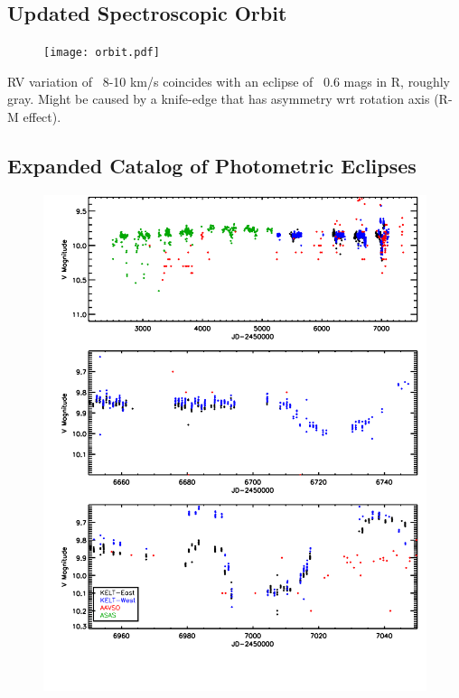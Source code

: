 \documentclass{aastex6}
\begin{document}
\subsection{Updated Spectroscopic Orbit}

\begin{figure}[htb]
\begin{center}
  \texttt{[image: orbit.pdf]}
  \end{center}
\end{figure}

RV variation of ~8-10 km/s coincides with an eclipse of ~0.6 mags in R, roughly gray. Might be caused by a knife-edge that has asymmetry wrt rotation axis (R-M effect).


\subsection{Expanded Catalog of Photometric Eclipses}


\begin{figure}[htb]
\begin{center}
  \includegraphics[height=0.5\textheight]{KELT_eclipses.pdf}
  \end{center}
\end{figure}
\end{document}
